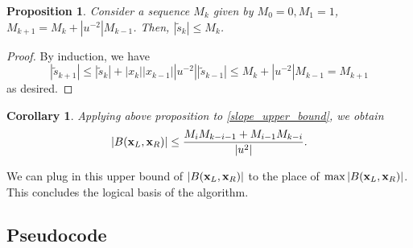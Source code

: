 \documentclass{article}
\theoremstyle{definition}
\theoremstyle{plain}
\newtheorem{corollary}[theorem]{Corollary}
\newtheorem{proposition}{Proposition}[section]
\theoremstyle{remark}
\numberwithin{equation}{section}
\newcommand{\abs}[1]{\left\lvert{#1}\right\rvert}
\begin{document}
\begin{proposition}
  Consider a sequence $M_k$ given by $M_0 = 0, M_1 = 1$, $M_{k+1} = M_k + \abs{u^{-2}} M_{k-1}$.
  Then, $\abs{\tilde{s}_k} \leq M_k$.
\end{proposition}
\begin{proof}
  By induction, we have
  \[
    \abs{\tilde{s}_{k+1}}
    \leq \abs{\tilde{s}_k} + \abs{x_k} \abs{x_{k-1}} \abs{u^{-2}} \abs{\tilde{s}_{k-1}}
    \leq M_k + \abs{u^{-2}} M_{k-1} = M_{k+1}
  \]
  as desired.
\end{proof}

\begin{corollary}
  Applying above proposition to \eqref{slope_upper_bound}, we obtain
  \[
    \abs{B(\xsL, \xsR)} \leq \frac{M_i M_{k-i-1} + M_{i-1} M_{k-i}}{\abs{u^2}}.
  \]
\end{corollary}

We can plug in this upper bound of $\abs{B(\xsL, \xsR)}$ to the place of  $\max \abs{B(\xsL, \xsR)}$.
This concludes the logical basis of the algorithm.

\subsection{Pseudocode}
\end{document}
